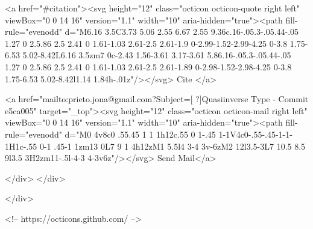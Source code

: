       <a  href="#citation"><svg height="12" class="octicon octicon-quote right left" viewBox="0 0 14 16" version="1.1" width="10" aria-hidden="true"><path fill-rule="evenodd" d="M6.16 3.5C3.73 5.06 2.55 6.67 2.55 9.36c.16-.05.3-.05.44-.05 1.27 0 2.5.86 2.5 2.41 0 1.61-1.03 2.61-2.5 2.61-1.9 0-2.99-1.52-2.99-4.25 0-3.8 1.75-6.53 5.02-8.42L6.16 3.5zm7 0c-2.43 1.56-3.61 3.17-3.61 5.86.16-.05.3-.05.44-.05 1.27 0 2.5.86 2.5 2.41 0 1.61-1.03 2.61-2.5 2.61-1.89 0-2.98-1.52-2.98-4.25 0-3.8 1.75-6.53 5.02-8.42l1.14 1.84h-.01z"/></svg> Cite
      </a>

      <a href="mailto:prieto.jona@gmail.com?Subject=[ ?]Quasiinverse Type - Commit e5ca005" target="_top"><svg height="12" class="octicon octicon-mail right left" viewBox="0 0 14 16" version="1.1" width="10" aria-hidden="true"><path fill-rule="evenodd" d="M0 4v8c0 .55.45 1 1 1h12c.55 0 1-.45 1-1V4c0-.55-.45-1-1-1H1c-.55 0-1 .45-1 1zm13 0L7 9 1 4h12zM1 5.5l4 3-4 3v-6zM2 12l3.5-3L7 10.5 8.5 9l3.5 3H2zm11-.5l-4-3 4-3v6z"/></svg> Send Mail</a>

    </div>
  </div>

</div>

<!-- https://octicons.github.com/ -->





